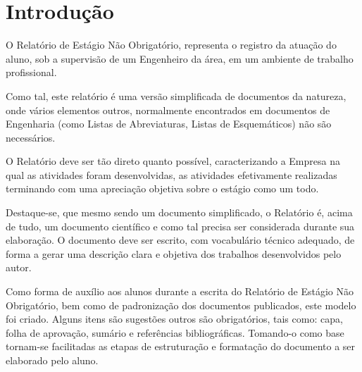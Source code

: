 \documentclass[repeatfields,xlists,xpacks,oneside,yearsonly]{ufrgscca}
\begin{document}



    \tableofcontents



    \chapter{Introdução}

    O Relatório de Estágio Não Obrigatório,  representa o registro da atuação do aluno, sob a supervisão de um Engenheiro da área, em um ambiente de trabalho profissional.

    Como tal, este relatório é uma versão simplificada de documentos da natureza, onde vários elementos outros, normalmente encontrados em documentos de Engenharia (como Listas de Abreviaturas, Listas de Esquemáticos) não são necessários.

    O Relatório deve ser tão direto quanto possível, caracterizando a Empresa na qual as atividades foram desenvolvidas, as atividades efetivamente realizadas terminando com uma apreciação objetiva sobre o estágio como um todo.

    Destaque-se, que mesmo sendo um documento simplificado, o Relatório é,
    acima de tudo, um documento científico e como tal precisa ser considerada
    durante sua elaboração. O documento deve ser escrito, com vocabulário
    técnico adequado, de forma a gerar uma descrição clara e objetiva dos
    trabalhos desenvolvidos pelo autor.

    Como forma de auxílio aos alunos durante a escrita do Relatório de Estágio Não Obrigatório, bem como de padronização dos documentos publicados, este modelo foi criado. Alguns itens são sugestões outros são
    obrigatórios, tais como: capa, folha de aprovação, sumário
    e referências bibliográficas. Tomando-o como base tornam-se facilitadas as
    etapas de estruturação e formatação do documento a ser elaborado pelo aluno.
\end{document}
